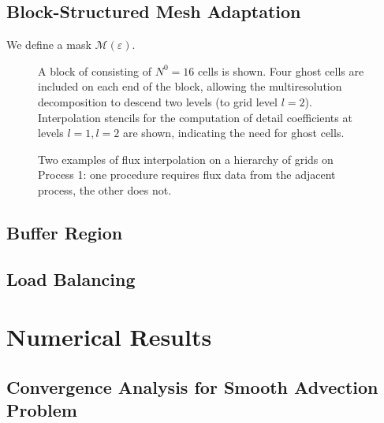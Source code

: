 \documentclass[]{article}
\begin{document}
    \subsection*{Block-Structured Mesh Adaptation}
    We define a mask $\bm{\mathcal{M}}(\varepsilon)$.

    \begin{figure}[H]
        \center
        
        \caption{A block of consisting of $N^{0} = 16$ cells is shown. Four
        ghost cells are included on each end of the block, allowing the
        multiresolution decomposition to descend two levels (to grid level
        $l=2$). Interpolation stencils for the computation of detail
        coefficients at levels $l=1, l=2$ are shown, indicating the need for ghost cells.}
    \end{figure}
    \begin{figure}[H]
        \center
        
        \caption{}
    \end{figure}


    \begin{figure}[H]
        \center
        
       \caption{Two examples of flux interpolation on a hierarchy of grids
        on Process 1: one procedure requires flux data from the adjacent
        process, the other does not.}
    \end{figure}

    \subsection*{Buffer Region}

    \subsection*{Load Balancing}

\section{Numerical Results}

    \subsection*{Convergence Analysis for Smooth Advection Problem}
\end{document}
